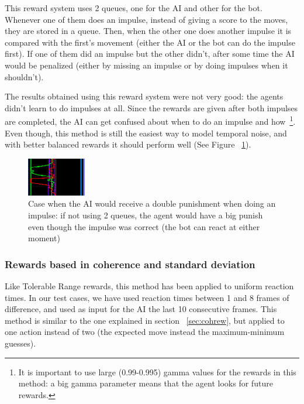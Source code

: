 This reward system uses 2 queues, one for the AI and other for the bot. Whenever one of them does an impulse, instead of giving a score to the moves, they are stored in a queue. Then, when the other one does another impulse it is compared with the first's movement (either the AI or the bot can do the impulse first). If one of them did an impulse but the other didn't, after some time the AI would be penalized (either by missing an impulse or by doing impulses when it shouldn't).

The results obtained using this reward system were not very good: the agents didn't learn to do impulses at all. Since the rewards are given after both impulses are completed, the AI can get confused about when to do an impulse and how~\footnote{It is important to use large (0.99-0.995) gamma values for the rewards in this method: a big gamma parameter means that the agent looks for future rewards.}. Even though, this method is still the easiest way to model temporal noise, and with better balanced rewards it should perform well (See Figure ~\ref{fig:punDelay}).

\begin{figure}[h]
  \centering
		\includegraphics[width=.3\textwidth]{img/punDelay.png}
  \caption{Case when the AI would receive a double punishment when doing an impulse: if not using 2 queues, the agent would have a big punish even though the impulse was correct (the bot can react at either moment)}
  \label{fig:punDelay}
\end{figure}

\subsubsection{Rewards based in coherence and standard deviation}
\label{sec:rewchstd}

Like Tolerable Range rewards, this method has been applied to uniform reaction times. In our test cases, we have used reaction times between 1 and 8 frames of difference, and used as input for the AI the last 10 consecutive frames. This method is similar to the one explained in section ~\ref{sec:cohrew}, but applied to one action instead of two (the expected move instead the maximum-minimum guesses).

